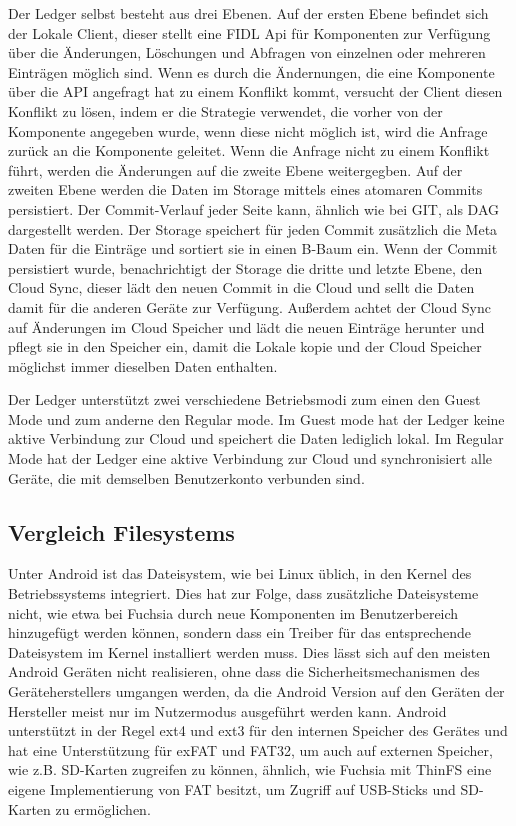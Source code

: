 \documentclass[a4paper]{scrartcl}
\begin{document}
Der Ledger selbst besteht aus drei Ebenen. Auf der ersten Ebene befindet sich der Lokale Client, dieser stellt eine FIDL Api für Komponenten zur Verfügung über die Änderungen, Löschungen und Abfragen von einzelnen oder mehreren Einträgen möglich sind. Wenn es durch die Ändernungen, die eine Komponente über die API angefragt hat zu einem Konflikt kommt, versucht der Client diesen Konflikt zu lösen, indem er die Strategie verwendet, die vorher von der Komponente angegeben wurde, wenn diese nicht möglich ist, wird die Anfrage zurück an die Komponente geleitet. Wenn die Anfrage nicht zu einem Konflikt führt, werden die Änderungen auf die zweite Ebene weitergegben. Auf der zweiten Ebene werden die Daten im Storage mittels eines atomaren Commits persistiert. Der Commit-Verlauf jeder Seite kann, ähnlich wie bei GIT, als DAG dargestellt werden. Der Storage speichert für jeden Commit zusätzlich die Meta Daten für die Einträge und sortiert sie in einen B-Baum ein. Wenn der Commit persistiert wurde, benachrichtigt der Storage die dritte und letzte Ebene, den Cloud Sync, dieser lädt den neuen Commit in die Cloud und sellt die Daten damit für die anderen Geräte zur Verfügung. Außerdem achtet der Cloud Sync auf Änderungen im Cloud Speicher und lädt die neuen Einträge herunter und pflegt sie in den Speicher ein, damit die Lokale kopie und der Cloud Speicher möglichst immer dieselben Daten enthalten. 

Der Ledger unterstützt zwei verschiedene Betriebsmodi zum einen den Guest Mode und zum anderne den Regular mode. Im Guest mode hat der Ledger keine aktive Verbindung zur Cloud und speichert die Daten lediglich lokal. Im Regular Mode hat der Ledger eine aktive Verbindung zur Cloud und synchronisiert alle Geräte, die mit demselben Benutzerkonto verbunden sind.
\subsection{Vergleich Filesystems}
\label{sec:vglFileSystems}
Unter Android ist das Dateisystem, wie bei Linux üblich, in den Kernel des Betriebssystems integriert. Dies hat zur Folge, dass zusätzliche Dateisysteme nicht, wie etwa bei Fuchsia durch neue Komponenten im Benutzerbereich hinzugefügt werden können, sondern dass ein Treiber für das entsprechende Dateisystem im Kernel installiert werden muss. Dies lässt sich auf den meisten Android Geräten nicht realisieren, ohne dass die Sicherheitsmechanismen des Geräteherstellers umgangen werden, da die Android Version auf den Geräten der Hersteller meist nur im Nutzermodus ausgeführt werden kann. Android unterstützt in der Regel ext4 und ext3 für den internen Speicher des Gerätes und hat eine Unterstützung für exFAT und FAT32, um auch auf externen Speicher, wie z.B. SD-Karten zugreifen zu können, ähnlich, wie Fuchsia mit ThinFS eine eigene Implementierung von FAT besitzt, um Zugriff auf USB-Sticks und SD-Karten zu ermöglichen.
\end{document}
